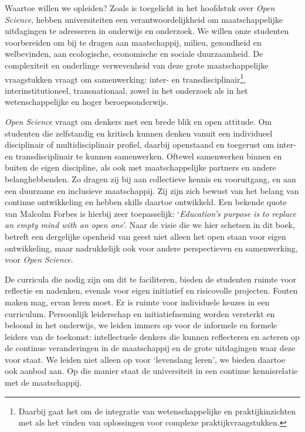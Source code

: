 \documentclass[smallauthor, chapterhaspagenum, nochapterinheader, pagenuminheader,  bigchapnum,medium2, tocpages,  garamond, titleinheader]{jote-book}
\begin{document}
	Waartoe willen we opleiden? Zoals is toegelicht in het hoofdstuk over \emph{Open }\emph{Science}, hebben universiteiten een verantwoordelijkheid om maatschappelijke uitdagingen te adresseren in onderwijs en onderzoek. We willen onze studenten voorbereiden om bij te dragen aan maatschappij, milieu, gezondheid en welbevinden, aan ecologische, economische en sociale duurzaamheid. De complexiteit en onderlinge verwevenheid van deze grote maatschappelijke vraagstukken vraagt om samenwerking: inter- en transdisciplinair\footnote{Daarbij gaat het om de integratie van wetenschappelijke en praktijkinzichten met als het vinden van oplossingen voor complexe praktijkvraagstukken.}, interinstitutioneel, transnationaal, zowel in het onderzoek als in het wetenschappelijke en hoger beroepsonderwijs.



	\emph{Open }\emph{Science} vraagt om denkers met een brede blik en open attitude. Om studenten die zelfstandig en kritisch kunnen denken vanuit een individueel disciplinair of multidisciplinair profiel, daarbij openstaand en toegerust om inter- en transdisciplinair te kunnen samenwerken. Oftewel samenwerken binnen en buiten de eigen discipline, als ook met maatschappelijke partners en andere belanghebbenden. Zo dragen zij bij aan collectieve kennis en vooruitgang, en aan een duurzame en inclusieve maatschappij. Zij zijn zich bewust van het belang van continue ontwikkeling en hebben skills daartoe ontwikkeld. Een bekende quote van Malcolm Forbes is hierbij zeer toepasselijk: ‘\emph{Education's purpose is }\emph{to}\emph{ replace an empty mind with an open one}'. Naar de visie die we hier schetsen in dit boek, betreft een dergelijke openheid van geest niet alleen het open staan voor eigen ontwikkeling, maar nadrukkelijk ook voor andere perspectieven en samenwerking, voor \emph{Open }\emph{Science}.



	De curricula die nodig zijn om dit te faciliteren, bieden de studenten ruimte voor reflectie en nadenken, evenals voor eigen initiatief en risicovolle projecten. Fouten maken mag, ervan leren moet. Er is ruimte voor individuele keuzes in een curriculum. Persoonlijk leiderschap en initiatiefneming worden versterkt en beloond in het onderwijs, we leiden immers op voor de informele en formele leiders van de toekomst: intellectuele denkers die kunnen reflecteren en acteren op de continue veranderingen in de maatschappij en de grote uitdagingen waar deze voor staat. We leiden niet alleen op voor ‘levenslang leren', we bieden daartoe ook aanbod aan. Op die manier staat de universiteit in een continue kennisrelatie met de maatschappij.
\end{document}
